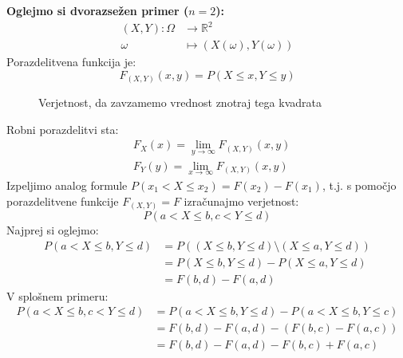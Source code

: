\documentclass[12pt]{book}
\def\n{\noindent}
\theoremstyle{definition}
\theoremstyle{plain}
\theoremstyle{plain}
\theoremstyle{plain}
\theoremstyle{remark}
\begin{document}
\n \textbf{Oglejmo si dvorazsežen primer ($n=2$):}
$$
\begin{aligned}
    (X, Y): \Omega & \to \mathbb{R}^2 \\
    \omega & \mapsto(X(\omega), Y(\omega))
    \end{aligned}
$$
Porazdelitvena funkcija je: 
$$
F_{(X, Y)}(x, y)=P(X \leq x, Y \leq y)
$$

\begin{figure}[H]
    \centering

    \caption{Verjetnost, da zavzamemo vrednost znotraj tega kvadrata}
    \label{fig:21}
\end{figure}

\n Robni porazdelitvi sta: 
$$
\begin{aligned}
    &F_X(x)=\lim _{y \rightarrow \infty} F_{(X, Y)}{(x, y)} \\
    &F_Y(y)=\lim _{x \rightarrow \infty} F_{(X,Y)}(x, y)
\end{aligned}
$$
Izpeljimo analog formule $P\left(x_1<X \leq x_2\right)=F\left(x_2\right)-F\left(x_1\right)$, t.j. s pomočjo porazdelitvene funkcije $F_{(X, Y)}=F$ izračunajmo verjetnost:
$$
P(a<X \leq b, c<Y \leq d)
$$
Najprej si oglejmo:
$$
\begin{aligned}
    P(a<X \leq b, Y \leq d)&=P\left((X \leq b, Y \leq d) \setminus (X \leq a, Y \leq d)\right) \\
    &=P(X \leq b, Y \leq d)-P(X \leq a, Y \leq d) \\
    &=F(b, d)-F(a, d)
\end{aligned}
$$
V splošnem primeru: 
$$
\begin{aligned}
    P(a<X \leq b, c<Y \leq d)&=P(a<X \leq b, Y \leq d) - P(a<X \leq b, Y \leq c) \\
    &=F(b, d)-F(a, d) - (F(b, c)-F(a, c)) \\
    &=F(b, d)-F(a, d)-F(b, c)+F(a, c)
\end{aligned}
$$
\end{document}
